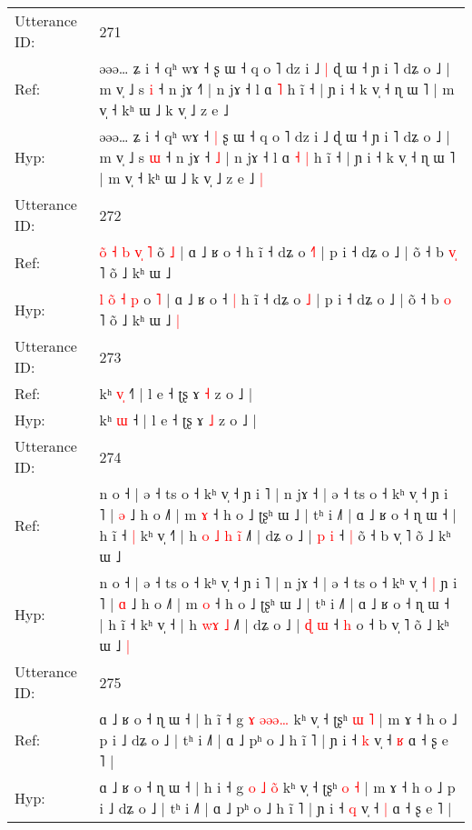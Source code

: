\documentclass[10pt]{article}
\DeclareRobustCommand{\hl}[1]{{\textcolor{red}{#1}}}
\begin{document}
\begin{longtable}{ll}
 \\
\midrule
Utterance ID: & 271 \\
Ref: & əəə… ʑ i ˧ qʰ wɤ ˧\hl{}\hl{} ʂ ɯ ˧ q o ˥ dz i ˩\hl{ }\hl{|} ɖ ɯ ˧ ɲ i ˥ dʑ o ˩ | m v̩ ˩ s \hl{i} ˧ n jɤ ˧\hl{}\hl{˥} | n jɤ ˧ l ɑ\hl{}\hl{} \hl{˥} h ĩ ˧ | ɲ i ˧ k v̩ ˧ ɳ ɯ ˥ | m v̩ ˧ kʰ ɯ ˩ k v̩ ˩ z e ˩\hl{}\hl{}
 \\
Hyp: & əəə… ʑ i ˧ qʰ wɤ ˧\hl{ }\hl{|} ʂ ɯ ˧ q o ˥ dz i ˩\hl{}\hl{} ɖ ɯ ˧ ɲ i ˥ dʑ o ˩ | m v̩ ˩ s \hl{ɯ} ˧ n jɤ ˧\hl{ }\hl{˩} | n jɤ ˧ l ɑ\hl{ }\hl{˧} \hl{|} h ĩ ˧ | ɲ i ˧ k v̩ ˧ ɳ ɯ ˥ | m v̩ ˧ kʰ ɯ ˩ k v̩ ˩ z e ˩\hl{ }\hl{|}
 \\
\midrule
Utterance ID: & 272 \\
Ref: & \hl{o}\hl{̃} \hl{˧}\hl{ }\hl{b} \hl{v}\hl{̩} \hl{˥} o\hl{̃} \hl{˩} | ɑ ˩ ʁ o ˧\hl{}\hl{} h ĩ ˧ dʑ o \hl{˧}\hl{˥} | p i ˧ dʑ o ˩ | õ ˧ b \hl{v}\hl{̩} ˥ õ ˩ kʰ ɯ ˩\hl{}\hl{}
 \\
Hyp: & \hl{}\hl{l} \hl{}\hl{o}\hl{̃} \hl{}\hl{˧} \hl{p} o\hl{} \hl{˥} | ɑ ˩ ʁ o ˧\hl{ }\hl{|} h ĩ ˧ dʑ o \hl{}\hl{˩} | p i ˧ dʑ o ˩ | õ ˧ b \hl{}\hl{o} ˥ õ ˩ kʰ ɯ ˩\hl{ }\hl{|}
 \\
\midrule
Utterance ID: & 273 \\
Ref: & kʰ \hl{v}\hl{̩} ˧\hl{˥} | l e ˧ ʈʂ ɤ \hl{˧} z o ˩ |
 \\
Hyp: & kʰ \hl{}\hl{ɯ} ˧\hl{} | l e ˧ ʈʂ ɤ \hl{˩} z o ˩ |
 \\
\midrule
Utterance ID: & 274 \\
Ref: & n o ˧ | ə ˧ ts o ˧ kʰ v̩ ˧ ɲ i ˥ | n jɤ ˧ | ə ˧ ts o ˧ kʰ v̩ ˧\hl{}\hl{} ɲ i ˥ | \hl{ə} ˩ h o ˩˥ | m \hl{ɤ} ˧ h o ˩ ʈʂʰ ɯ ˩ | tʰ i ˩˥ | ɑ ˩ ʁ o ˧ ɳ ɯ ˧ | h ĩ ˧\hl{ }\hl{|} kʰ v̩ ˧\hl{˥} | h\hl{ }\hl{o} \hl{˩}\hl{ }\hl{h} \hl{i}\hl{̃} ˩˥ | dʑ o ˩ | \hl{p} \hl{i} ˧ \hl{|} o\hl{̃} ˧ b v̩ ˥ õ ˩ kʰ ɯ ˩\hl{}\hl{}
 \\
Hyp: & n o ˧ | ə ˧ ts o ˧ kʰ v̩ ˧ ɲ i ˥ | n jɤ ˧ | ə ˧ ts o ˧ kʰ v̩ ˧\hl{ }\hl{|} ɲ i ˥ | \hl{ɑ} ˩ h o ˩˥ | m \hl{o} ˧ h o ˩ ʈʂʰ ɯ ˩ | tʰ i ˩˥ | ɑ ˩ ʁ o ˧ ɳ ɯ ˧ | h ĩ ˧\hl{}\hl{} kʰ v̩ ˧\hl{} | h\hl{}\hl{} \hl{}\hl{w}\hl{ɤ} \hl{}\hl{˩} ˩˥ | dʑ o ˩ | \hl{ɖ} \hl{ɯ} ˧ \hl{h} o\hl{} ˧ b v̩ ˥ õ ˩ kʰ ɯ ˩\hl{ }\hl{|}
 \\
\midrule
Utterance ID: & 275 \\
Ref: & ɑ ˩ ʁ o ˧ ɳ ɯ ˧ | h i\hl{̃} ˧ g \hl{ɤ} \hl{ə}\hl{ə}\hl{ə}\hl{…} kʰ v̩ ˧ ʈʂʰ \hl{ɯ} \hl{˥} | m ɤ ˧ h o ˩ p i ˩ dʑ o ˩ | tʰ i ˩˥ | ɑ ˩ pʰ o ˩ h ĩ ˥ | ɲ i ˧ \hl{k} v̩ ˧ \hl{ʁ} ɑ ˧ ʂ e ˥ |
 \\
Hyp: & ɑ ˩ ʁ o ˧ ɳ ɯ ˧ | h i\hl{} ˧ g \hl{o} \hl{˩}\hl{ }\hl{o}\hl{̃} kʰ v̩ ˧ ʈʂʰ \hl{o} \hl{˧} | m ɤ ˧ h o ˩ p i ˩ dʑ o ˩ | tʰ i ˩˥ | ɑ ˩ pʰ o ˩ h ĩ ˥ | ɲ i ˧ \hl{q} v̩ ˧ \hl{|} ɑ ˧ ʂ e ˥ |

\end{longtable}
\end{document}
